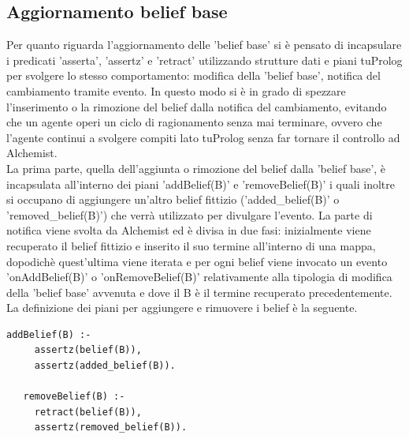 \documentclass[12pt,a4paper,openright,twoside]{report}
\begin{document}
\subsection{Aggiornamento belief base}
Per quanto riguarda l'aggiornamento delle 'belief base' si \`e pensato di incapsulare i predicati 'asserta', 'assertz' e 'retract' utilizzando strutture dati e piani tuProlog per svolgere lo stesso comportamento: modifica della 'belief base', notifica del cambiamento tramite evento. In questo modo si \`e in grado di spezzare l'inserimento o la rimozione del belief dalla notifica del cambiamento, evitando che un agente operi un ciclo di ragionamento senza mai terminare, ovvero che l'agente continui a svolgere compiti lato tuProlog senza far tornare il controllo ad Alchemist.
\\
La prima parte, quella dell'aggiunta o rimozione del belief dalla 'belief base', \`e incapsulata all'interno dei piani 'addBelief(B)' e 'removeBelief(B)' i quali inoltre si occupano di aggiungere un'altro belief fittizio ('added\_belief(B)' o 'removed\_belief(B)') che verr\`a utilizzato per divulgare l'evento.
La parte di notifica viene svolta da Alchemist ed \`e divisa in due fasi: inizialmente viene recuperato il belief fittizio e inserito il suo termine all'interno di una mappa, dopodich\`e quest'ultima viene iterata e per ogni belief viene invocato un evento 'onAddBelief(B)' o 'onRemoveBelief(B)' relativamente alla tipologia di modifica della 'belief base' avvenuta e dove il B \`e il termine recuperato precedentemente.
La definizione dei piani per aggiungere e rimuovere i belief \`e la seguente.
\medskip
{}
\begin{lstlisting}[firstnumber=1,caption={Implementazione piani per l'aggiunta e rimozione di belief}]
   addBelief(B) :-
     assertz(belief(B)),
     assertz(added_belief(B)).

   removeBelief(B) :-
     retract(belief(B)),
     assertz(removed_belief(B)).
\end{lstlisting}

\end{document}
